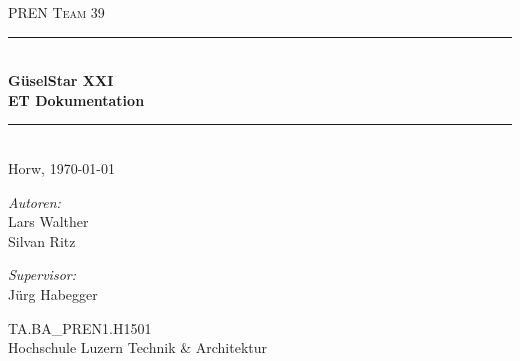 \begin{titlepage}   

\begin{center}
\textsc{\Large PREN Team 39}\\[0.5cm]

\newcommand{\HRule}{\rule{\linewidth}{0.5mm}}
\HRule \\[0.4cm]
{ \huge \bfseries GüselStar XXI}\\[0.4cm]
{ \LARGE \bfseries ET Dokumentation}\\[0.4cm]
\HRule \\[1.5cm]

{\large Horw, \today}

\begin{minipage}{0.4\textwidth}
\begin{flushleft} \large
\emph{Autoren:}\\
Lars Walther\\
Silvan Ritz
\end{flushleft}
\end{minipage}
\hfill
\begin{minipage}{0.4\textwidth}
\begin{flushright} \large
\emph{Supervisor:} \\
Jürg Habegger
\end{flushright}
\end{minipage}
\large
\vfill
TA.BA\_PREN1.H1501 \\
Hochschule Luzern Technik \& Architektur

\end{center}

\end{titlepage}
